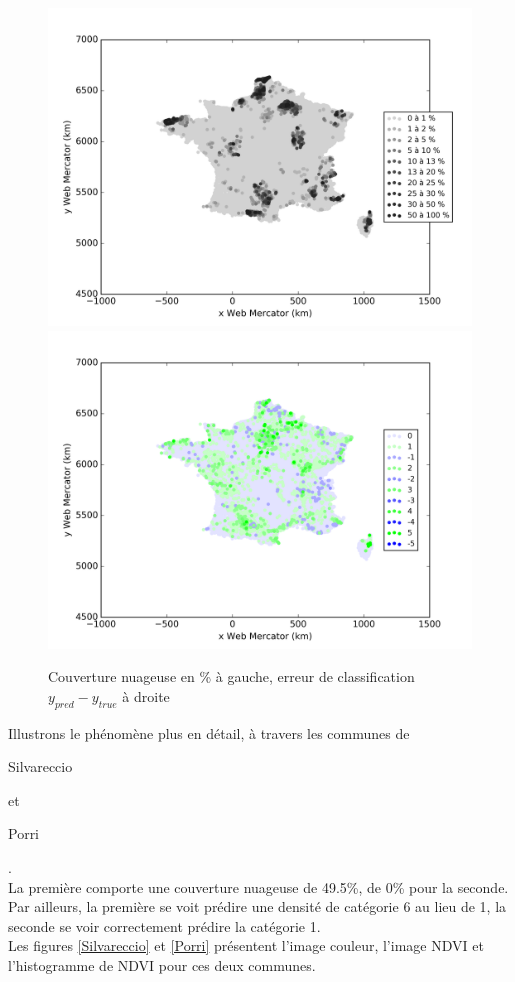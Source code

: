 \documentclass{book}
\begin{document}
\begin{figure}[H]
\centerline{
\includegraphics[scale=0.5]{../../data/France/test/Neural_Network_Classification-oversampling/Neural_Network_Classification-oversampling/density_covering.png}
\includegraphics[scale=0.5]{../../data/France/test/Neural_Network_Classification-oversampling/Neural_Network_Classification-oversampling/density_classification_error.png}
}
\caption{Couverture nuageuse en \% à gauche, erreur de classification $y_{pred}-y_{true}$  à droite}
\label{nuage}
\end{figure}

Illustrons le phénomène plus en détail, à travers les communes de \begin{itshape}Silvareccio\end{itshape} et \begin{itshape}Porri\end{itshape}.\\
La première comporte une couverture nuageuse de 49.5\%, de 0\% pour la seconde.\\
Par ailleurs, la première se voit prédire une densité de catégorie 6 au lieu de 1, la seconde se voir correctement prédire la catégorie 1.\\
Les figures \ref{Silvareccio} et \ref{Porri} présentent l'image couleur, l'image NDVI et l'histogramme de NDVI pour ces deux communes.
\end{document}
